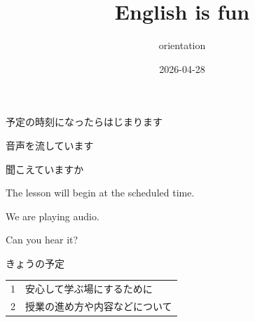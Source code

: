 \documentclass[
  ignorenonframetext,
  aspectratio=169,
  xcolor=dvipsnames]{beamer}
\title{English is fun}
\subtitle{orientation}
\author{}
\date{\vspace{-2.5em}2026-04-28}
\begin{document}
\frame{\titlepage}

\begin{frame}{}
\protect{}\label{section}
\thispagestyle{empty}
\Large

\raggedright

予定の時刻になったらはじまります

\textbullet  音声を流しています

\textbullet  聞こえていますか　

\vfill

\raggedleft

The lesson will begin at the scheduled time.

\vspace{-6pt}

We are playing audio.

\vspace{-6pt}

Can you hear it?
\end{frame}

\begin{frame}{}
\protect{}\label{section-1}
\thispagestyle{empty}
\titlepage
\end{frame}

\begin{frame}{きょうの予定}
\protect{}\label{ux304dux3087ux3046ux306eux4e88ux5b9a}
\thispagestyle{empty}
\LARGE

\begin{tabular}{rl}
1&安心して学ぶ場にするために\\
2&授業の進め方や内容などについて
\end{tabular}
\end{frame}
\end{document}
